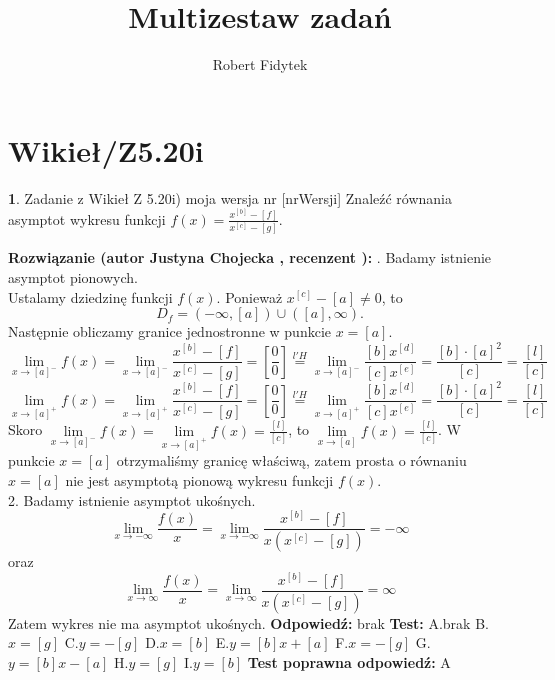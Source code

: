 \documentclass[12pt, a4paper]{article}
\title{Multizestaw zadań}
\author{Robert Fidytek}
\date{}
\theoremstyle{definition} %
\newtheorem{zad}{}
\newcommand{\kategoria}[1]{\section{#1}} %
\newcommand{\zadStart}[1]{\begin{zad}#1\newline} %
\newcommand{\zadStop}{\end{zad}}   %
\newcommand{\rozwStart}[2]{\noindent \textbf{Rozwiązanie (autor #1 , recenzent #2): }\newline} %
\newcommand{\rozwStop}{\newline}                                            %
\newcommand{\odpStart}{\noindent \textbf{Odpowiedź:}\newline}    %
\newcommand{\odpStop}{\newline}                                             %
\newcommand{\testStart}{\noindent \textbf{Test:}\newline} %
\newcommand{\testStop}{\newline} %
\newcommand{\kluczStart}{\noindent \textbf{Test poprawna odpowiedź:}\newline} %
\newcommand{\kluczStop}{\newline} %
\begin{document}
\maketitle


\kategoria{Wikieł/Z5.20i}
\zadStart{Zadanie z Wikieł Z 5.20i) moja wersja nr [nrWersji]}
Znaleźć równania asymptot wykresu funkcji $f(x)=\frac{x^{[b]}-[f]}{x^{[c]}-[g]}$.
\zadStop
\rozwStart{Justyna Chojecka}{}
1. Badamy istnienie asymptot pionowych.\\
Ustalamy dziedzinę funkcji $f(x)$. Ponieważ $x^{[c]}-[a]\neq 0$, to 
$$D_{f}=(-\infty,[a]) \cup ([a],\infty).$$
Następnie obliczamy granice jednostronne w punkcie $x=[a].$
$$\lim\limits_{x\to [a]^{-}}f(x)=\lim\limits_{x\to [a]^{-}}\frac{x^{[b]}-[f]}{x^{[c]}-[g]}=\left[\frac{0}{0}\right]\overset{l'H} {=}\lim\limits_{x\to [a]^{-}}\frac{[b]x^{[d]}}{[c]x^{[e]}}=\frac{[b]\cdot [a]^{2}}{[c]}=\frac{[l]}{[c]}$$
$$\lim\limits_{x\to [a]^{+}}f(x)=\lim\limits_{x\to [a]^{+}}\frac{x^{[b]}-[f]}{x^{[c]}-[g]}=\left[\frac{0}{0}\right]\overset{l'H} {=}\lim\limits_{x\to [a]^{+}}\frac{[b]x^{[d]}}{[c]x^{[e]}}=\frac{[b]\cdot [a]^{2}}{[c]}=\frac{[l]}{[c]}$$
Skoro $\lim\limits_{x\to [a]^{-}}f(x)=\lim\limits_{x\to [a]^{+}}f(x)=\frac{[l]}{[c]}$, to $\lim\limits_{x\to [a]}f(x)=\frac{[l]}{[c]}$. W punkcie $x=[a]$ otrzymaliśmy granicę właściwą, zatem  prosta o równaniu $x=[a]$ nie jest asymptotą pionową wykresu funkcji $f(x)$.\\
2. Badamy istnienie asymptot ukośnych.\\
$$\lim\limits_{x\to -\infty}\frac{f(x)}{x}=\lim\limits_{x\to -\infty}\frac{x^{[b]}-[f]}{x(x^{[c]}-[g])}=-\infty$$
oraz
$$\lim\limits_{x\to \infty}\frac{f(x)}{x}=\lim\limits_{x\to \infty}\frac{x^{[b]}-[f]}{x(x^{[c]}-[g])}=\infty$$
Zatem wykres nie ma asymptot ukośnych.
\rozwStop
\odpStart
brak
\odpStop
\testStart
A.brak
B.$x=[g]$
C.$y=-[g]$
D.$x=[b]$
E.$y=[b]x+[a]$
F.$x=-[g]$
G.$y=[b]x-[a]$
H.$y=[g]$
I.$y=[b]$
\testStop
\kluczStart
A
\kluczStop
\end{document}

